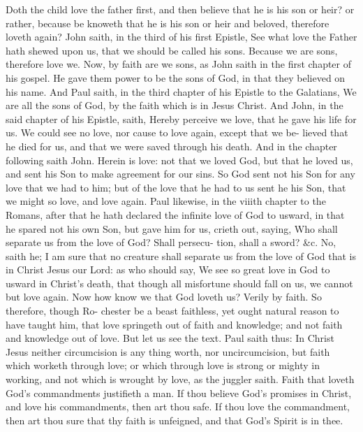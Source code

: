 \documentclass{custom}
\begin{document}
Doth the child love the father first, and then believe that 
he is his son or heir? or rather, because be knoweth that 
he is his son or heir and beloved, therefore loveth again? 
John saith, in the third of his first Epistle, See what love 
the Father hath shewed upon us, that we should be called
his sons. Because we are sons, therefore love we. Now, 
by faith are we sons, as John saith in the first chapter of 
his gospel. He gave them power to be the sons of God, 
in that they believed on his name. And Paul saith, in 
the third chapter of his Epistle to the Galatians, We are 
all the sons of God, by the faith which is in Jesus Christ. 
And John, in the said chapter of his Epistle, saith, Hereby 
perceive we love, that he gave his life for us. We could 
see no love, nor cause to love again, except that we be- 
lieved that he died for us, and that we were saved through 
his death. And in the chapter following saith John. 
Herein is love: not that we loved God, but that he loved 
us, and sent his Son to make agreement for our sins. So 
God sent not his Son for any love that we had to him; 
but of the love that he had to us sent he his Son, that we 
might so love, and love again. Paul likewise, in the 
viiith chapter to the Romans, after that he hath declared 
the infinite love of God to usward, in that he spared not 
his own Son, but gave him for us, crieth out, saying, Who 
shall separate us from the love of God? Shall persecu- 
tion, shall a sword? &c. No, saith he; I am sure that 
no creature shall separate us from the love of God 
that is in Christ Jesus our Lord: as who should say, 
We see so great love in God to usward in Christ's 
death, that though all misfortune should fall on us, we
cannot but love again. Now how know we that God 
loveth us? Verily by faith. So therefore, though Ro- 
chester be a beast faithless, yet ought natural reason to
have taught him, that love springeth out of faith and 
knowledge; and not faith and knowledge out of love. 
But let us see the text. Paul saith thus: In Christ Jesus 
neither circumcision is any thing worth, nor uncircumcision, 
but faith which worketh through love; or which through 
love is strong or mighty in working, and not which is 
wrought by love, as the juggler saith. Faith that loveth 
God's commandments justifieth a man. If thou believe 
God's promises in Christ, and love his commandments, 
then art thou safe. If thou love the commandment, then 
art thou sure that thy faith is unfeigned, and that God's 
Spirit is in thee. 
\end{document}
